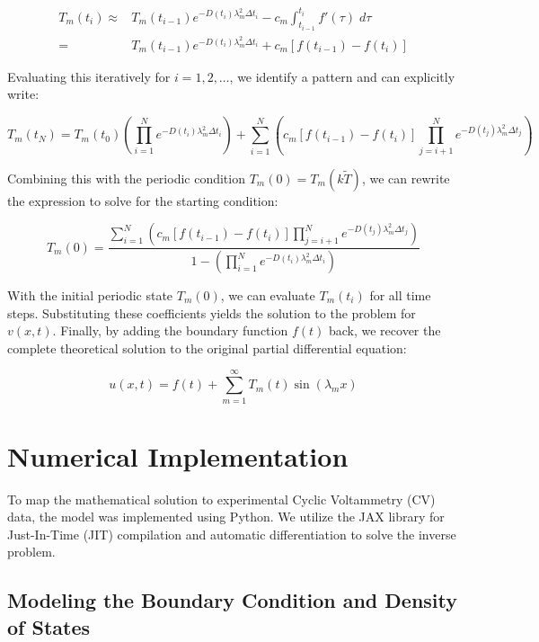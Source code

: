 \documentclass{article}
\begin{document}
\begin{align*}
        T_m(t_i) \approx & T_m(t_{i-1})e^{-D(t_i)\lambda_m^2\Delta t_i} - c_m\int_{t_{i-1}}^{t_i}f'(\tau)\; d\tau\\
        =& T_m(t_{i-1})e^{-D(t_i)\lambda_m^2\Delta t_i} + c_m\left[f(t_{i-1}) - f(t_i)\right]
\end{align*}

Evaluating this iteratively for $i = 1,2,\dots$, we identify a pattern and can explicitly write:

\begin{equation}
    T_m(t_N) = T_m(t_0)\left(\prod_{i = 1}^{N} e^{-D(t_i)\lambda_m^2\Delta t_i}\right) + \sum_{i = 1}^N\left(c_m[f(t_{i-1}) - f(t_i)]\prod_{j = i+1}^N e^{-D(t_j)\lambda_m^2\Delta t_j}\right)
\end{equation}

Combining this with the periodic condition $T_m(0) = T_m(k\tilde{T})$, we can rewrite the expression to solve for the starting condition:

\begin{equation}
\label{Init Time}
    T_m(0) = \frac{\sum_{i = 1}^N\left(c_m[f(t_{i-1}) - f(t_i)]\prod_{j = i+1}^N e^{-D(t_j)\lambda_m^2\Delta t_j}\right)}{1-\left(\prod_{i = 1}^{N} e^{-D(t_i)\lambda_m^2\Delta t_i}\right) }
\end{equation}

With the initial periodic state $T_m(0)$, we can evaluate $T_m(t_i)$ for all time steps. Substituting these coefficients yields the solution to the problem for $v(x,t)$. Finally, by adding the boundary function $f(t)$ back, we recover the complete theoretical solution to the original partial differential equation:

\begin{equation}
    u(x,t) = f(t) + \sum_{m=1}^\infty T_m(t)\sin(\lambda_m x)
\end{equation}

\section{Numerical Implementation}

To map the mathematical solution to experimental Cyclic Voltammetry (CV) data, the model was implemented using Python. We utilize the JAX library for Just-In-Time (JIT) compilation and automatic differentiation to solve the inverse problem.

\subsection{Modeling the Boundary Condition and Density of States}
\end{document}
